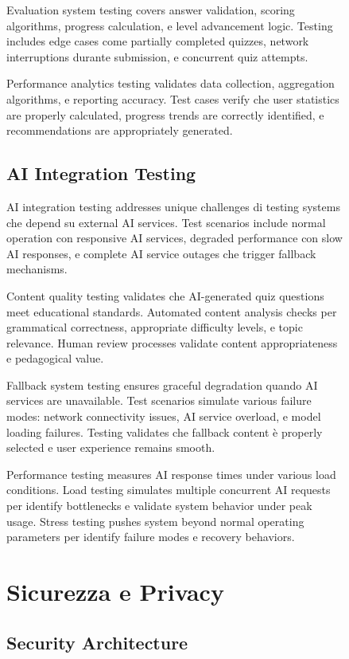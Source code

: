 \documentclass[12pt,a4paper]{article}
\begin{document}
\begin{figure}[H]
Evaluation system testing covers answer validation, scoring algorithms, progress calculation, e level advancement logic. Testing includes edge cases come partially completed quizzes, network interruptions durante submission, e concurrent quiz attempts.

Performance analytics testing validates data collection, aggregation algorithms, e reporting accuracy. Test cases verify che user statistics are properly calculated, progress trends are correctly identified, e recommendations are appropriately generated.

\subsection{AI Integration Testing}

AI integration testing addresses unique challenges di testing systems che depend su external AI services. Test scenarios include normal operation con responsive AI services, degraded performance con slow AI responses, e complete AI service outages che trigger fallback mechanisms.

Content quality testing validates che AI-generated quiz questions meet educational standards. Automated content analysis checks per grammatical correctness, appropriate difficulty levels, e topic relevance. Human review processes validate content appropriateness e pedagogical value.

Fallback system testing ensures graceful degradation quando AI services are unavailable. Test scenarios simulate various failure modes: network connectivity issues, AI service overload, e model loading failures. Testing validates che fallback content è properly selected e user experience remains smooth.

Performance testing measures AI response times under various load conditions. Load testing simulates multiple concurrent AI requests per identify bottlenecks e validate system behavior under peak usage. Stress testing pushes system beyond normal operating parameters per identify failure modes e recovery behaviors.

\section{Sicurezza e Privacy}

\subsection{Security Architecture}


\end{figure}
\end{document}
